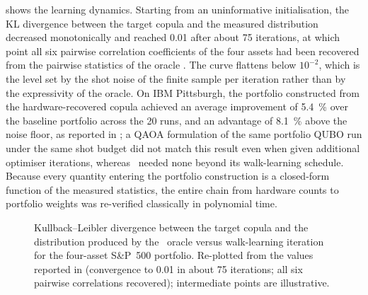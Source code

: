  shows the learning dynamics. Starting from an uninformative initialisation, the KL divergence between the target copula and the measured distribution decreased monotonically and reached 0.01 after about 75 iterations, at which point all six pairwise correlation coefficients of the four assets had been recovered from the pairwise statistics of the oracle \cite{guo2025qawa}. The curve flattens below $10^{-2}$, which is the level set by the shot noise of the finite sample per iteration rather than by the expressivity of the oracle. On IBM Pittsburgh, the portfolio constructed from the hardware-recovered copula achieved an average improvement of \SI{5.4}{\percent} over the baseline portfolio across the 20 runs, and an advantage of \SI{8.1}{\percent} above the noise floor, as reported in \cite{guo2025qawa}; a QAOA formulation of the same portfolio QUBO run under the same shot budget did not match this result even when given additional optimiser iterations, whereas \qawa\ needed none beyond its walk-learning schedule. Because every quantity entering the portfolio construction is a closed-form function of the measured statistics, the entire chain from hardware counts to portfolio weights was re-verified classically in polynomial time.

\begin{figure}[htbp]
\centering
{}
\caption{Kullback--Leibler divergence between the target copula and the distribution produced by the \qawa\ oracle versus walk-learning iteration for the four-asset S\&P~500 portfolio. Re-plotted from the values reported in \cite{guo2025qawa} (convergence to 0.01 in about 75 iterations; all six pairwise correlations recovered); intermediate points are illustrative.}
\label{fig:nisq:qawa-kl}
\end{figure}

